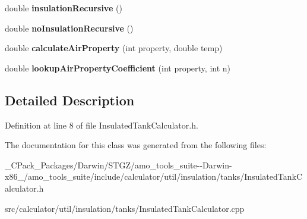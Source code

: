 \begin{DoxyCompactItemize}
\mbox{\label{class_insulated_tank_calculator_aa924a8b8a7e0d17e33666e910b8d6d0b}} 
double {\bfseries insulation\+Recursive} ()
\item 
\mbox{\label{class_insulated_tank_calculator_a5b470dbc6c206cce9c997be281997f20}} 
double {\bfseries no\+Insulation\+Recursive} ()
\item 
\mbox{\label{class_insulated_tank_calculator_a2f7dfc0f35c887849f778e7e342efe48}} 
double {\bfseries calculate\+Air\+Property} (int property, double temp)
\item 
\mbox{\label{class_insulated_tank_calculator_af91fb268ec43e8cb3ccdbce40f45b46c}} 
double {\bfseries lookup\+Air\+Property\+Coefficient} (int property, int n)
\end{DoxyCompactItemize}


\subsection{Detailed Description}


Definition at line 8 of file Insulated\+Tank\+Calculator.\+h.



The documentation for this class was generated from the following files\+:\begin{DoxyCompactItemize}
\item 
\+\_\+\+C\+Pack\+\_\+\+Packages/\+Darwin/\+S\+T\+G\+Z/amo\+\_\+tools\+\_\+suite-\/-\/\+Darwin-\/x86\+\_/amo\+\_\+tools\+\_\+suite/include/calculator/util/insulation/tanks/Insulated\+Tank\+Calculator.\+h\item 
src/calculator/util/insulation/tanks/Insulated\+Tank\+Calculator.\+cpp\end{DoxyCompactItemize}

